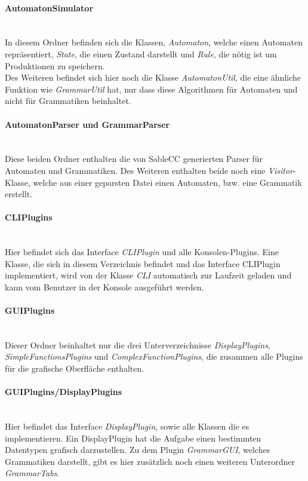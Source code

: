 \paragraph{AutomatonSimulator}\ \\
In diesem Ordner befinden sich die Klassen, \textit{Automaton}, welche einen Automaten repräsentiert, \textit{State}, die einen Zustand darstellt und \textit{Rule}, die nötig ist um Produktionen zu speichern.\\
Des Weiteren befindet sich hier noch die Klasse \textit{AutomatonUtil}, die eine ähnliche Funktion wie \textit{GrammarUtil} hat, nur dass diese Algorithmen für Automaten und nicht für Grammatiken beinhaltet.
\paragraph{AutomatonParser und GrammarParser}\ \\
Diese beiden Ordner enthalten die von SableCC generierten Parser für Automaten und Grammatiken. Des Weiteren enthalten beide noch eine \textit{Visitor}-Klasse, welche aus einer geparsten Datei einen Automaten, bzw. eine Grammatik erstellt.
\paragraph{CLIPlugins}\ \\
Hier befindet sich das Interface \textit{CLIPlugin} und alle Konsolen-Plugins. Eine Klasse, die sich in diesem Verzeichnis befindet und das Interface CLIPlugin implementiert, wird von der Klasse \textit{CLI} automatisch zur Laufzeit geladen und kann vom Benutzer in der Konsole ausgeführt werden.
\paragraph{GUIPlugins}\ \\
Dieser Ordner beinhaltet nur die drei Unterverzeichnisse \textit{DisplayPlugins}, \textit{SimpleFunctionsPlugins} und \textit{ComplexFunctionPlugins}, die zusammen alle Plugins für die grafische Oberfläche enthalten.
\paragraph{GUIPlugins/DisplayPlugins}\ \\
Hier befindet das Interface \textit{DisplayPlugin}, sowie alle Klassen die es implementieren. Ein DisplayPlugin hat die Aufgabe einen bestimmten Datentypen grafisch darzustellen. Zu dem Plugin \textit{GrammarGUI}, welches Grammatiken darstellt, gibt es hier zusätzlich noch einen weiteren Unterordner \textit{GrammarTabs}.
